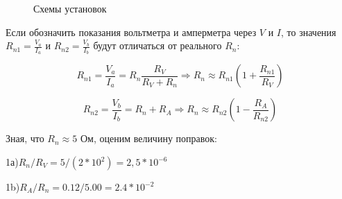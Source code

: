 \documentclass[14pt]{article}
\begin{document}
	\newpage
	\vspace*{2cm}
	\begin{figure}[h!]
		\caption{Схемы установок}
		\label{fig:image}
	\end{figure}
	
	\newpage
	
	Если обозначить показания вольтметра и амперметра через $V$ и $I$, то значения $R_{n1} = \frac{V_a}{I_a}$ и $R_{n2} = \frac{V_b}		{I_b}$ будут отличаться от реального $R_n$:
	
	$$R_{n1} = \frac{V_a}{I_a} = R_n\frac{R_V}{R_V + R_n} \Rightarrow R_n \approx R_{n1}\left( 1 + \frac{R_{n1}}{R_V} \right)$$
	
	$$R_{n2} = \frac{V_b}{I_b} = R_n + R_A \Rightarrow R_n \approx R_{n2} \left(1 - \frac{R_A}{R_{n2}}\right)$$

	Зная, что $R_n \approx 5$ Ом, оценим величину поправок:

	1а)\hspace{0.5cm}$R_n/R_V = 5/(2*10^{2}) = 2,5*10^{-6}$
	
	1b)\hspace{0.5cm}$R_A/R_n = 0.12/5.00 = 2.4*10^{-2}$
	
\end{document}

